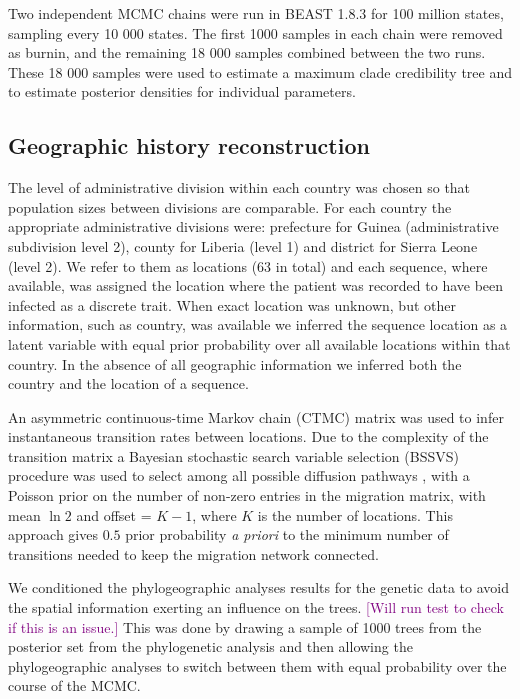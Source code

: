 \documentclass[11pt,oneside,letterpaper]{article}
\def\tbc#1{\textcolor{purple}{[#1]}}
\begin{document}
Two independent MCMC chains were run in BEAST 1.8.3 \citep{drummond_2012} for 100 million states, sampling every 10 000 states. 
The first 1000 samples in each chain were removed as burnin, and the remaining 18 000 samples combined between the two runs.
These 18 000 samples were used to estimate a maximum clade credibility tree and to estimate posterior densities for individual parameters.

\subsection*{Geographic history reconstruction}

The level of administrative division within each country was chosen so that population sizes between divisions are comparable. 
For each country the appropriate administrative divisions were: prefecture for Guinea (administrative subdivision level 2), county for Liberia (level 1) and district for Sierra Leone (level 2). 
We refer to them as locations (63 in total) and each sequence, where available, was assigned the location where the patient was recorded to have been infected as a discrete trait. 
When exact location was unknown, but other information, such as country, was available we inferred the sequence location as a latent variable with equal prior probability over all available locations within that country. 
In the absence of all geographic information we inferred both the country and the location of a sequence.

An asymmetric continuous-time Markov chain (CTMC) \citep{lemey_2009,edwards_2011} matrix was used to infer instantaneous transition rates between locations. 
Due to the complexity of the transition matrix a Bayesian stochastic search variable selection (BSSVS) procedure was used to select among all possible diffusion pathways \citep{lemey_2009}, with a Poisson prior on the number of non-zero entries in the migration matrix, with mean $\ln 2$ and offset = $K-1$, where $K$ is the number of locations.
This approach gives $0.5$ prior probability \textit{a priori} to the minimum number of transitions needed to keep the migration network connected.

We conditioned the phylogeographic analyses results for the genetic data to avoid the spatial information exerting an influence on the trees. \tbc{Will run test to check if this is an issue.}
This was done by drawing a sample of 1000 trees from the posterior set from the phylogenetic analysis and then allowing the phylogeographic analyses to switch between them with equal probability over the course of the MCMC.
\end{document}
